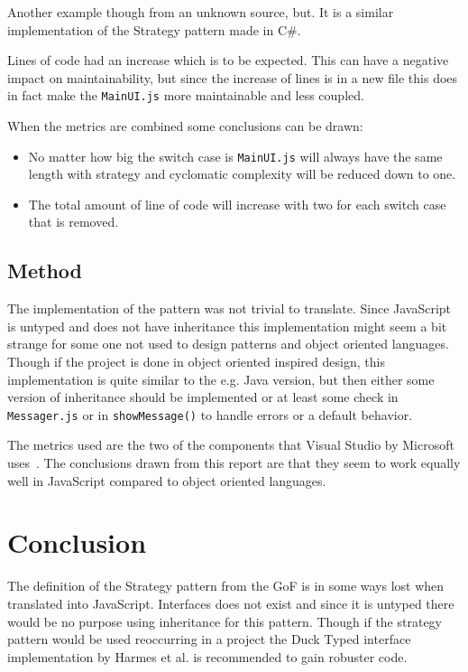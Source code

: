 \documentclass[conference, a4paper]{IEEEtran}
\begin{document}
Another example though from an unknown source, but. It is a similar implementation of the Strategy pattern made in C\#.~\cite{bibitem:CSharp}

Lines of code had an increase which is to be expected. This can have a negative impact on maintainability, but since the increase of lines is in a new file this does in fact make the \texttt{MainUI.js} more maintainable and less coupled.

When the metrics are combined some conclusions can be drawn:
\begin{itemize}
	\item No matter how big the switch case is \texttt{MainUI.js} will always have the same length with strategy and cyclomatic complexity will be reduced down to one.
	\item The total amount of line of code will increase with two for each switch case that is removed.
\end{itemize}

\subsection{Method}
The implementation of the pattern was not trivial to translate. Since JavaScript is untyped and does not have inheritance this implementation might seem a bit strange for some one not used to design patterns and object oriented languages. Though if the project is done in object oriented inspired design, this implementation is quite similar to the e.g. Java version, but then either some version of inheritance should be implemented or at least some check in \texttt{Messager.js} or in \texttt{showMessage()} to handle errors or a default behavior.

The metrics used are the two of the components that Visual Studio by Microsoft uses~\cite{bibitem:MI}. The conclusions drawn from this report are that they seem to work equally well in JavaScript compared to object oriented languages.

\section{Conclusion}
The definition of the Strategy pattern from the GoF is in some ways lost when translated into JavaScript. Interfaces does not exist and since it is untyped there would be no purpose using inheritance for this pattern. Though if the strategy pattern would be used reoccurring in a project the Duck Typed interface implementation by Harmes et al. is recommended to gain robuster code.~\cite{bibitem:DiazHarmes}
\end{document}

